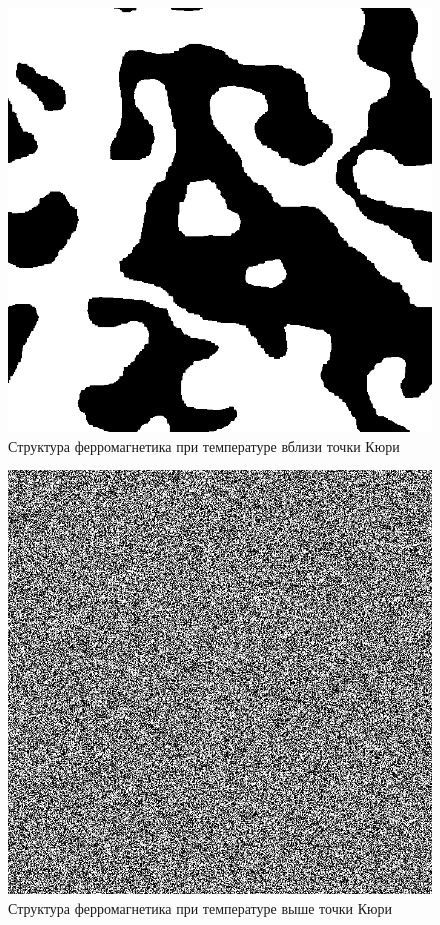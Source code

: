 \documentclass[12pt]{report}
\theoremstyle{definition}
\begin{document}
\begin{figure}[hbtp]
    \centering
    \includegraphics[scale=0.3]{img/low_t.png}
    \caption{Структура ферромагнетика при температуре вблизи точки Кюри}
\end{figure}
\begin{figure}[hbtp]
    \centering
    \includegraphics[scale=0.3]{img/high_t.png}
    \caption{Структура ферромагнетика при температуре выше точки Кюри}
\end{figure}
\end{document}
